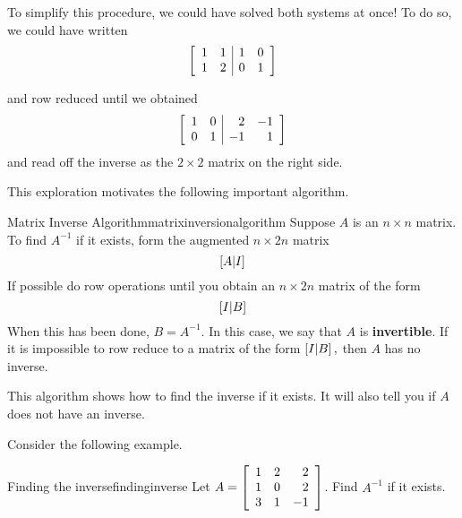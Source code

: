 To simplify this procedure, we could have solved both systems at once!
To do so, we could have written
\begin{equation*}
\left[
\begin{array}{rr|rr}
1 & 1 & 1 & 0 \\
1 & 2 & 0 & 1
\end{array}
\right]
\end{equation*}

and row reduced until we obtained
\begin{equation*}
\left[
\begin{array}{rr|rr}
1 & 0 & 2 & -1 \\
0 & 1 & -1 & 1
\end{array}
\right]
\end{equation*}
and read off the inverse as the $2\times 2$ matrix on the right side.

This exploration motivates the following important algorithm.

\begin{algorithm}{Matrix Inverse Algorithm}{matrixinversionalgorithm}
Suppose $A$ is an $n\times n$ matrix. To find $A^{-1}$ if it exists, form
the augmented $n\times 2n$ matrix
\begin{equation*}
\left[ A|I\right]
\end{equation*}
If possible do row operations until you obtain an $n\times 2n$
matrix of the form
\begin{equation*}
\left[ I|B\right]  
\end{equation*}
When this has been done, $B=A^{-1}.$ In this case, we say that $A$ is \textbf{invertible}. 
If it is impossible to row reduce to a
matrix of the form $\left[ I|B\right] ,$ then $A$ has no inverse.
\end{algorithm}

This algorithm shows how to find the inverse if it exists. It will also tell you if
$A$ does not have an inverse. 

Consider the following example.

\begin{example}{Finding the inverse}{findinginverse}
Let $A=\left[
\begin{array}{rrr}
1 & 2 & 2 \\
1 & 0 & 2 \\
3 & 1 & -1
\end{array}
\right] $. Find $A^{-1}$ if it exists.
\end{example}

